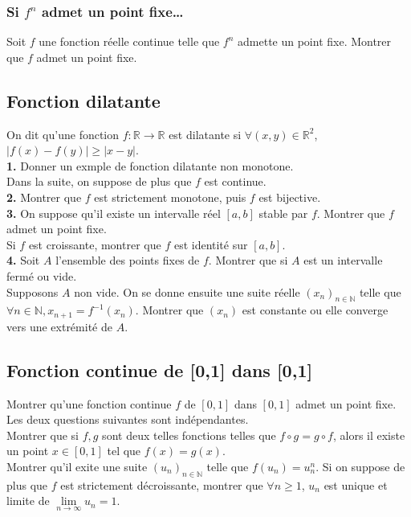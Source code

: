 \documentclass{article}
\begin{document}
\subsubsection{Si $f^n$ admet un point fixe\dots}
Soit $f$ une fonction r\'eelle continue telle que $f^n$ admette un point fixe. Montrer que $f$ admet un point fixe.

\subsection{Fonction dilatante}
On dit qu'une fonction $f:\mathbb{R}\to\mathbb{R}$ est dilatante si $\forall (x,y)\in\mathbb{R}^2$, $|f(x)-f(y)|\geq|x-y|$.\\
\textbf{1.} Donner un exmple de fonction dilatante non monotone.\\
Dans la suite, on suppose de plus que $f$ est continue.\\
\textbf{2.} Montrer que $f$ est strictement monotone, puis $f$ est bijective.\\
\textbf{3.} On suppose qu'il existe un intervalle r\'eel $[a,b]$ stable par $f$. Montrer que $f$ admet un point fixe.\\
Si $f$ est croissante, montrer que $f$ est identit\'e sur $[a,b]$.\\
\textbf{4.} Soit $A$ l'ensemble des points fixes de $f$. Montrer que si $A$ est un intervalle ferm\'e ou vide.\\
Supposons $A$ non vide. On se donne ensuite une suite r\'eelle $(x_n)_{n\in\mathbb{N}}$ telle que $\forall n\in\mathbb{N}, x_{n+1}=f^{-1}(x_n)$. Montrer que $(x_n)$ est constante ou elle converge vers une extr\'emit\'e de $A$.

\subsection{Fonction continue de [0,1] dans [0,1]}
Montrer qu'une fonction continue $f$ de $[0,1]$ dans $[0,1]$ admet un point fixe.\\
Les deux questions suivantes sont ind\'ependantes.\\
Montrer que si $f,g$ sont deux telles fonctions telles que $f\circ g=g\circ f$, alors il existe un point $x\in[0,1]$ tel que $f(x)=g(x)$.\\
Montrer qu'il exite une suite $(u_n)_{n\in\mathbb{N}}$ telle que $f(u_n)=u_n^n$. Si on suppose de plus que $f$ est strictement d\'ecroissante, montrer que $\forall n\geq 1$, $u_n$ est unique et limite de $\lim\limits_{n\to\infty}u_n=1$.
\end{document}
